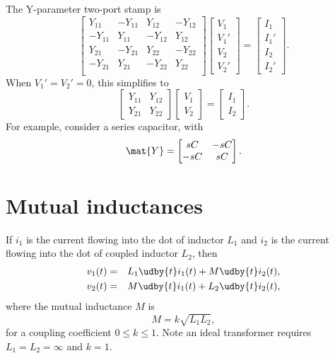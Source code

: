 \documentclass[a4paper, 12pt]{article}
\begin{document}
The Y-parameter two-port stamp is
%
\begin{equation}
  \begin{bmatrix}
Y_{11} & -Y_{11} & Y_{12} & -Y_{12} \\
-Y_{11} & Y_{11} & -Y_{12} & Y_{12} \\
Y_{21} & -Y_{21} & Y_{22} & -Y_{22} \\
-Y_{21} & Y_{21} & -Y_{22} & Y_{22} \\
  \end{bmatrix}
  \begin{bmatrix}
    V_1 \\ V_1' \\ V_2 \\ V_2'
  \end{bmatrix}
=
\begin{bmatrix}
  I_1 \\ I_1' \\ I_2 \\ I_2'
\end{bmatrix}.
\end{equation}
%
When $V_1' = V_2' = 0$, this simplifies to
%
\begin{equation}
  \begin{bmatrix}
Y_{11} & Y_{12} \\
Y_{21} & Y_{22}
  \end{bmatrix}
  \begin{bmatrix}
    V_1 \\ V_2 
  \end{bmatrix}
=
\begin{bmatrix}
  I_1 \\ I_2 
\end{bmatrix}.
\end{equation}
%
For example, consider a series capacitor, with
%
\begin{equation}
  \mat{Y} =
  \begin{bmatrix}
    sC & -sC \\
   -sC &  sC
  \end{bmatrix}.
\end{equation}


\section{Mutual inductances}


If $i_1$ is the current flowing into the dot of inductor $L_1$ and
$i_2$ is the current flowing into the dot of coupled inductor $L_2$,
%
then
%
\begin{eqnarray}
 v_1(t) & = & L_1 \udby{t} i_1(t) + M \udby{t} i_2(t),\\
 v_2(t) & = & M \udby{t} i_1(t) + L_2 \udby{t} i_2(t),
\label{eqn:mut}
\end{eqnarray}
%
where the mutual inductance $M$ is
%
\begin{equation}
  M = k \sqrt{L_1 L_2},
\end{equation}
%
for a coupling coefficient $0 \le k \le 1$.  Note an ideal transformer
requires $L_1 = L_2 = \infty$ and $k=1$.
\end{document}

